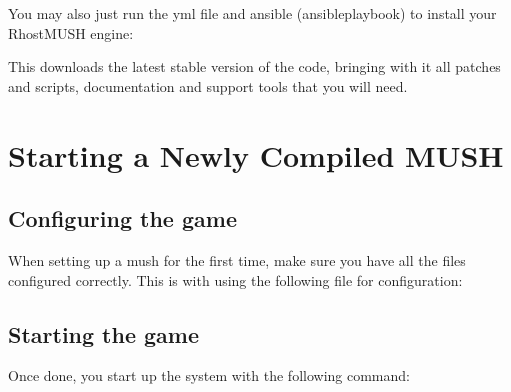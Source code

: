 \documentclass[letterpaper,10pt,english]{sphinxmanual}
\begin{document}
\begin{sphinxVerbatim}[commandchars=\\\{\}]
   
\end{sphinxVerbatim}

\sphinxAtStartPar
You may also just run the yml file and ansible (ansible\sphinxhyphen{}playbook) to install your RhostMUSH engine:

\begin{sphinxVerbatim}[commandchars=\\\{\}]
 
 
\end{sphinxVerbatim}

\sphinxAtStartPar
This downloads the latest stable version of the code, bringing with it all patches and scripts, documentation and support tools that you will need.


\section{Starting a Newly Compiled MUSH}
\label{\detokenize{install:starting-a-newly-compiled-mush}}

\subsection{Configuring the game}
\label{\detokenize{install:configuring-the-game}}
\sphinxAtStartPar
When setting up a mush for the first time, make sure you
have all the files configured correctly.  This is with using
the following file for configuration:

\begin{sphinxVerbatim}[commandchars=\\\{\}]
 
\end{sphinxVerbatim}


\subsection{Starting the game}
\label{\detokenize{install:starting-the-game}}
\sphinxAtStartPar
Once done, you start up the system with the following command:
\end{document}
